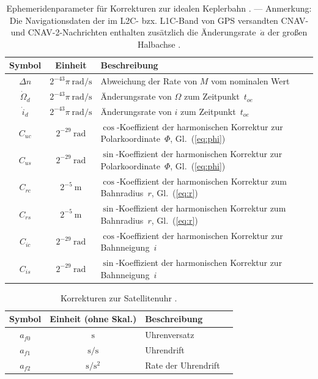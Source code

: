 \documentclass[10pt,a4paper]{article}
\begin{document}
\begin{table}
\caption{\label{tbl:ephemeris_correction} Ephemeridenparameter für  Korrekturen zur idealen Keplerbahn \cite{groves_2013}.
--- Anmerkung: Die Navigationsdaten der im L2C- bzx. L1C-Band von GPS versandten CNAV- und CNAV-2-Nachrichten enthalten zusätzlich die Änderungsrate~$\dot{a}$ der großen Halbachse \cite{rinex_4_02}.}
\centering

\begin{tabular}{|c|c|l|}
\hline
Symbol & Einheit & Beschreibung \\
\hline
$\Delta n$ & $2^{-43}\pi\ \mathrm{rad/s}$ & 
\parbox[t]{7cm}{Abweichung der Rate von $M$\\ vom nominalen Wert} \\
$\dot{\Omega}_d$ & $2^{-43}\pi\ \mathrm{rad/s}$ & Änderungsrate von $\Omega$ zum Zeitpunkt~$t_{oe}$ \\
$\dot{i}_d$ & $2^{-43}\pi\ \mathrm{rad/s}$ & Änderungsrate von $i$ zum Zeitpunkt~$t_{oe}$ \\
$C_{uc}$ & $2^{-29}\ \mathrm{rad}$ & 
\parbox[t]{7cm}{$\cos$-Koeffizient der harmonischen Korrektur \\ 
zur Polarkoordinate~$\Phi$, Gl.~(\ref{eq:phi})} \\
$C_{us}$ & $2^{-29}\ \mathrm{rad}$ & 
\parbox[t]{7cm}{$\sin$-Koeffizient der harmonischen Korrektur \\ 
zur Polarkoordinate~$\Phi$, Gl.~(\ref{eq:phi})} \\
$C_{rc}$ & $2^{-5}\ \mathrm{m}$ & 
\parbox[t]{7cm}{$\cos$-Koeffizient der harmonischen Korrektur \\ 
zum Bahnradius~$r$, Gl.~(\ref{eq:r})} \\
$C_{rs}$ & $2^{-5}\ \mathrm{m}$ & 
\parbox[t]{7cm}{$\sin$-Koeffizient der harmonischen Korrektur \\ 
zum Bahnradius~$r$, Gl.~(\ref{eq:r})} \\
$C_{ic}$ & $2^{-29}\ \mathrm{rad}$ & 
\parbox[t]{7cm}{$\cos$-Koeffizient der harmonischen Korrektur \\ 
zur Bahnneigung~$i$} \\
$C_{is}$ & $2^{-29}\ \mathrm{rad}$ & 
\parbox[t]{7cm}{$\sin$-Koeffizient der harmonischen Korrektur \\ 
zur Bahnneigung~$i$} \\
\hline
\end{tabular}
\end{table}


\begin{table}
\caption{\label{tbl:ephemeris_sv_clock} 
Korrekturen zur Satellitenuhr \cite{rinex_4_02}.}
\centering

\begin{tabular}{|c|c|l|c|}
\hline
Symbol & Einheit (ohne Skal.) & Beschreibung \\
\hline
$a_{f0}$ & $\mathrm{s}$ & Uhrenversatz \\
$a_{f1}$ & $\mathrm{s/s}$ & Uhrendrift \\
$a_{f2}$ & $\mathrm{s/s^2}$ & Rate der Uhrendrift \\
\hline
\end{tabular}
\end{table}
\end{document}
